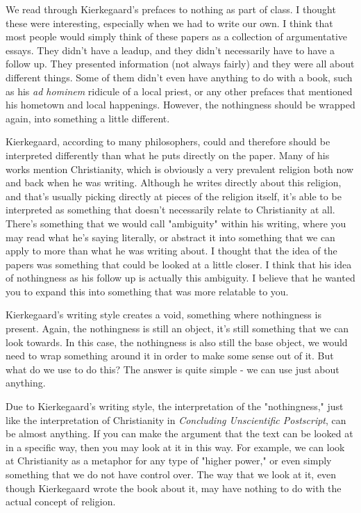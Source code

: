 \documentclass[12pt]{article}
\begin{document}
  We read through Kierkegaard's prefaces to nothing as part of class. I thought these were interesting, especially
  when we had to write our own. I think that most people would simply think of these papers as a collection of
  argumentative essays. They didn't have a leadup, and they didn't necessarily have to have a follow up. They 
  presented information (not always fairly) and they were all about different things. Some of them didn't even have
  anything to do with a book, such as his \textit{ad hominem} ridicule of a local priest, or any other prefaces that
  mentioned his hometown and local happenings. However, the nothingness should be wrapped again, into something a
  little different.

  Kierkegaard, according to many philosophers, could and therefore should be interpreted differently than what he
  puts directly on the paper. Many of his works mention Christianity, which is obviously a very prevalent religion
  both now and back when he was writing. Although he writes directly about this religion, and that's usually picking
  directly at pieces of the religion itself, it's able to be interpreted as something that doesn't necessarily relate
  to Christianity at all. There's something that we would call "ambiguity" within his writing, where you may read
  what he's saying literally, or abstract it into something that we can apply to more than what he was writing about.
  I thought that the idea of the papers was something that could be looked at a little closer. I think that his idea
  of nothingness as his follow up is actually this ambiguity. I believe that he wanted you to expand this into something
  that was more relatable to you.

  Kierkegaard's writing style creates a void, something where nothingness is present. Again, the nothingness is still
  an object, it's still something that we can look towards. In this case, the nothingness is also still the base object,
  we would need to wrap something around it in order to make some sense out of it. But what do we use to do this? The
  answer is quite simple - we can use just about anything.

  Due to Kierkegaard's writing style, the interpretation of the "nothingness," just like the interpretation of
  Christianity in \textit{Concluding Unscientific Postscript}, can be almost anything. If you can make the argument
  that the text can be looked at in a specific way, then you may look at it in this way. For example, we can look at
  Christianity as a metaphor for any type of "higher power," or even simply something that we do not have control over.
  The way that we look at it, even though Kierkegaard wrote the book about it, may have nothing to do with the actual
  concept of religion.
  
\end{document}
